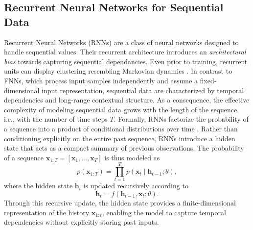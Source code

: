 \subsection{Recurrent Neural Networks for Sequential Data}
Recurrent Neural Networks (RNNs) \cite{rumelhart1986learning} are a class of neural networks designed to handle sequential values.
Their recurrent architecture introduces an \textit{architectural bias} towards capturing sequential dependancies. Even prior to training, recurrent units can display clustering resembling Markovian dynamics \cite{1263574}.
\newline
 In contrast to FNNs, which process input samples
independently and assume a fixed-dimensional input representation, sequential
data are characterized by temporal dependencies and long-range contextual
structure.
As a consequence, the effective complexity of modeling sequential data grows
with the length of the sequence, i.e., with the number of time steps $T$.
 \newline
 \newline
 Formally, RNNs factorize the probability of a sequence into a product of conditional distributions over time \cite{sutskever2014sequencesequencelearningneural}. 
Rather than conditioning explicitly on the entire past sequence, RNNs introduce a hidden state that acts as a compact summary of previous observations. 
The probability of a sequence $\mathbf{x}_{1:T} = [\mathbf{x}_1, \ldots, \mathbf{x}_T]$ is thus modeled as
\begin{equation}
    p(\mathbf{x}_{1:T}) = \prod_{t=1}^{T} p(\mathbf{x}_t \mid \mathbf{h}_{t-1}; \theta),
\end{equation}
where the hidden state $\mathbf{h}_t$ is updated recursively according to
\begin{equation}
    \mathbf{h}_t = f(\mathbf{h}_{t-1}, \mathbf{x}_t; \theta).
\end{equation}
Through this recursive update, the hidden state provides a finite-dimensional representation of the history $\mathbf{x}_{1:t}$, enabling the model to capture temporal dependencies without explicitly storing past inputs.
 \newline

